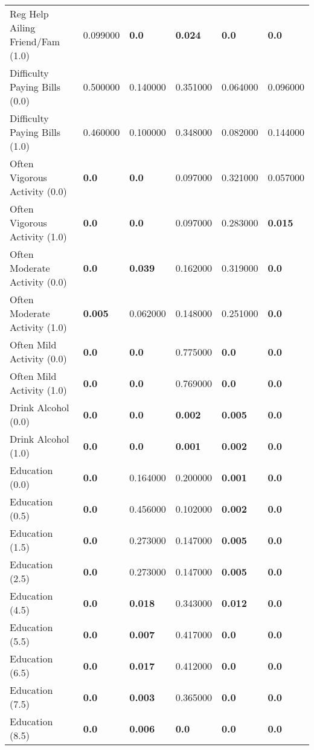 \begin{tabular}{llllll}
Reg Help Ailing Friend/Fam (1.0) & 0.099000 & \textbf{0.0} & \textbf{0.024} & \textbf{0.0} & \textbf{0.0} \\
Difficulty Paying Bills (0.0) & 0.500000 & 0.140000 & 0.351000 & 0.064000 & 0.096000 \\
Difficulty Paying Bills (1.0) & 0.460000 & 0.100000 & 0.348000 & 0.082000 & 0.144000 \\
Often Vigorous Activity (0.0) & \textbf{0.0} & \textbf{0.0} & 0.097000 & 0.321000 & 0.057000 \\
Often Vigorous Activity (1.0) & \textbf{0.0} & \textbf{0.0} & 0.097000 & 0.283000 & \textbf{0.015} \\
Often Moderate Activity (0.0) & \textbf{0.0} & \textbf{0.039} & 0.162000 & 0.319000 & \textbf{0.0} \\
Often Moderate Activity (1.0) & \textbf{0.005} & 0.062000 & 0.148000 & 0.251000 & \textbf{0.0} \\
Often Mild Activity (0.0) & \textbf{0.0} & \textbf{0.0} & 0.775000 & \textbf{0.0} & \textbf{0.0} \\
Often Mild Activity (1.0) & \textbf{0.0} & \textbf{0.0} & 0.769000 & \textbf{0.0} & \textbf{0.0} \\
Drink Alcohol (0.0) & \textbf{0.0} & \textbf{0.0} & \textbf{0.002} & \textbf{0.005} & \textbf{0.0} \\
Drink Alcohol (1.0) & \textbf{0.0} & \textbf{0.0} & \textbf{0.001} & \textbf{0.002} & \textbf{0.0} \\
Education (0.0) & \textbf{0.0} & 0.164000 & 0.200000 & \textbf{0.001} & \textbf{0.0} \\
Education (0.5) & \textbf{0.0} & 0.456000 & 0.102000 & \textbf{0.002} & \textbf{0.0} \\
Education (1.5) & \textbf{0.0} & 0.273000 & 0.147000 & \textbf{0.005} & \textbf{0.0} \\
Education (2.5) & \textbf{0.0} & 0.273000 & 0.147000 & \textbf{0.005} & \textbf{0.0} \\
Education (4.5) & \textbf{0.0} & \textbf{0.018} & 0.343000 & \textbf{0.012} & \textbf{0.0} \\
Education (5.5) & \textbf{0.0} & \textbf{0.007} & 0.417000 & \textbf{0.0} & \textbf{0.0} \\
Education (6.5) & \textbf{0.0} & \textbf{0.017} & 0.412000 & \textbf{0.0} & \textbf{0.0} \\
Education (7.5) & \textbf{0.0} & \textbf{0.003} & 0.365000 & \textbf{0.0} & \textbf{0.0} \\
Education (8.5) & \textbf{0.0} & \textbf{0.006} & \textbf{0.0} & \textbf{0.0} & \textbf{0.0} \\

\end{tabular}
